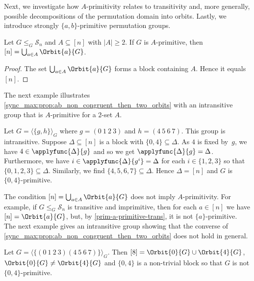 
Next, we investigate how $A$-primitivity relates to transitivity
and, more generally, possible decompositions of the permutation domain
into orbits. Lastly, we introduce strongly $\{a,b\}$-primitive permutation groups.

\begin{proposition}
	\label{sync_max:prop:ab_non_congruent_then_two_orbits}
	Let $G \le_G \mathcal S_n$
	and	$A \subseteq [n]$ with $|A| \ge 2$.
	If $G$ is $A$-primitive, then $[n] = \bigcup_{a \in A} \Orbit{a}{G}$.
\end{proposition}
\begin{proof}
	The set $\bigcup_{a \in A} \Orbit{a}{G}$ forms a block containing
	$A$. Hence it equals $[n]$. 
\end{proof}

The next example illustrates \cref{sync_max:prop:ab_non_congruent_then_two_orbits} 
with an intransitive group that is $A$-primitive
for a $2$-set $A$.

\begin{example}\label{sync_max:ex:abprim_intransitive}
	Let $G = \langle \{ g, h\} \rangle_G$
	where $g = (0 ~ 1 ~ 2 ~ 3)$ and $h = (4 ~ 5 ~ 6~ 7)$.
	This group is intransitive. Suppose $\Delta \subseteq [n]$
	is a block with $\{0,4\} \subseteq \Delta$.
	As $4$ is fixed by~$g$, we have $4 \in \applyfunc{\Delta}{g}$ 
	and so we get $\applyfunc{\Delta}{g} = \Delta$.
	Furthermore, we have $i \in \applyfunc{\Delta}{g^i} = \Delta$ for each $i \in \{1,2,3\}$
	so that $\{0,1,2,3\} \subseteq \Delta$.
	Similarly, we find $\{4,5,6,7\} \subseteq \Delta$.
	Hence $\Delta = [n]$ and $G$ is $\{0,4\}$-primitive.
\end{example}

The condition $[n] = \bigcup_{a \in A} \Orbit{a}{G}$
does not imply $A$-primitivity.
For example, if $G \le_G \mathcal S_n$
is transitive and imprimitive,
then for each $a \in [n]$ we have $[n] = \Orbit{a}{G}$, but, by \cref{prim-a-primitive-trans},
it is not $\{a\}$-primitive.
The next example gives an intransitive group
showing that the converse of \cref{sync_max:prop:ab_non_congruent_then_two_orbits}
does not hold in general.

\begin{example}
	Let $G = \langle \{  (0 ~ 1 ~ 2 ~ 3) (4 ~ 5 ~ 6 ~ 7) \} \rangle_G$.
	Then $[8] = \Orbit{0}{G} \cup \Orbit{4}{G}$,
	$\Orbit{0}{G} \ne \Orbit{4}{G}$
	and $\{0,4\}$ is a non-trivial block
	so that $G$ is not $\{0,4\}$-primitive.
\end{example}


